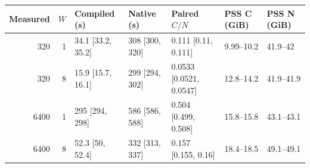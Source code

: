 \begin{tabular}{rrlllll}
\toprule
Measured & $W$ & Compiled (s) & Native (s) & Paired $C/N$ & PSS C (GiB) & PSS N (GiB) \\
\midrule
320 & 1 & 34.1 [33.2, 35.2] & 308 [300, 320] & 0.111 [0.11, 0.111] & 9.99--10.2 & 41.9--42 \\
320 & 8 & 15.9 [15.7, 16.1] & 299 [294, 302] & 0.0533 [0.0521, 0.0547] & 12.8--14.2 & 41.9--41.9 \\
6400 & 1 & 295 [294, 298] & 586 [586, 588] & 0.504 [0.499, 0.508] & 15.8--15.8 & 43.1--43.1 \\
6400 & 8 & 52.3 [50, 52.4] & 332 [313, 337] & 0.157 [0.155, 0.16] & 18.4--18.5 & 49.1--49.1 \\
\bottomrule
\end{tabular}
